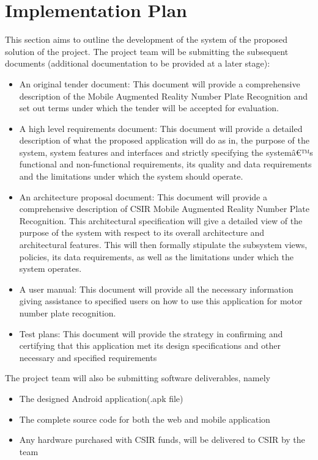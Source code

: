 \documentclass[a4paper]{article}
\begin{document}
	\section{Implementation Plan}
	This section aims to outline the development of the system of the proposed solution of the project. 
The project team will be submitting the subsequent documents (additional documentation to be provided at a later stage):
\begin{itemize}
\item	An original tender document: This document will provide a comprehensive description of the Mobile Augmented Reality Number Plate Recognition and set out terms under which the tender will be accepted for evaluation. 
\item	A high level requirements document:  This document will provide a detailed description of what the proposed application will do as in, the purpose of the system, system features and interfaces and strictly specifying the systemâ€™s functional and non-functional requirements, its quality and data requirements and the limitations under which the system should operate.
\item	An architecture proposal document: This document will provide a comprehensive description
of CSIR Mobile Augmented Reality Number Plate Recognition. This architectural specification will give a detailed view of the
purpose of the system with respect to its overall architecture and architectural features. This will
then formally stipulate the subsystem views, policies, its data requirements, as well as the
limitations under which the system operates.
\item	A user manual: This document will provide all the necessary information giving assistance to specified users on how to use this application for motor number plate recognition.
\item	Test plans: This document will provide the strategy in confirming and certifying that this application met its design specifications and other necessary and specified requirements
\end{itemize}
The project team will also be submitting software deliverables, namely
\begin{itemize}
\item	The designed Android application(.apk file)
\item	The complete source code for both the web and mobile application
\item	Any hardware purchased with CSIR funds, will be delivered to CSIR by the team
\end{itemize}
\end{document}
